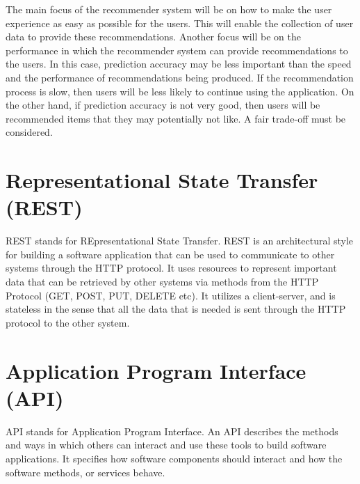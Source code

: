 The main focus of the recommender system will be on how to make the user experience as easy as possible for the users. This will enable the collection of user data to provide these recommendations. Another focus will be on the performance in which the recommender system can provide recommendations to the users. In this case, prediction accuracy may be less important than the speed and the performance of recommendations being produced. If the recommendation process is slow, then users will be less likely to continue using the application. On the other hand, if prediction accuracy is not very good, then users will be recommended items that they may potentially not like. A fair trade-off must be considered. 


\section{Representational State Transfer (REST)}

REST stands for REpresentational State Transfer. REST is an architectural style for building a software application that can be used to communicate to other systems through the HTTP protocol. It uses resources to represent important data that can be retrieved by other systems via methods from the HTTP Protocol (GET, POST, PUT, DELETE etc). It utilizes a client-server, and is stateless in the sense that all the data that is needed is sent through the HTTP protocol to the other system.

\section{Application Program Interface (API)}

API stands for Application Program Interface. An API describes the methods and ways in which others can interact and use these tools to build software applications. It specifies how software components should interact and how the software methods, or services behave. 